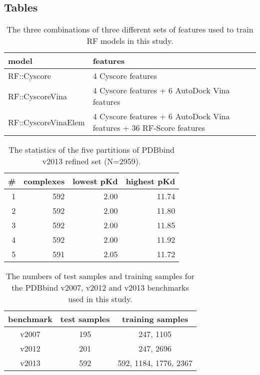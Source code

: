 \documentclass[twocolumn]{bmcart}
\begin{document}
\begin{backmatter}

\section*{Tables}

\begin{table}[ht]
\caption{The three combinations of three different sets of features used to train RF models in this study.}
\label{tbl:features}
\begin{tabular}{ll}
\hline
model & features\\
\hline
RF::Cyscore         & 4 Cyscore features\\
RF::CyscoreVina     & 4 Cyscore features + 6 AutoDock Vina features\\
RF::CyscoreVinaElem & 4 Cyscore features + 6 AutoDock Vina features + 36 RF-Score features\\
\hline
\end{tabular}
\end{table}

\begin{table}[ht]
\caption{The statistics of the five partitions of PDBbind v2013 refined set (N=2959).}
\label{tbl:partitions}
\begin{tabular}{rrrr}
\hline
\# & complexes & lowest pKd & highest pKd\\
\hline
1 & 592 & 2.00 & 11.74\\
2 & 592 & 2.00 & 11.80\\
3 & 592 & 2.00 & 11.85\\
4 & 592 & 2.00 & 11.92\\
5 & 591 & 2.05 & 11.72\\
\hline
\end{tabular}
\end{table}

\begin{table}[ht]
\caption{The numbers of test samples and training samples for the PDBbind v2007, v2012 and v2013 benchmarks used in this study.}
\label{tbl:benchmarks}
\begin{tabular}{ccc}
\hline
benchmark & test samples & training samples\\
\hline
v2007 & 195 & 247, 1105\\
v2012 & 201 & 247, 2696\\
v2013 & 592 & 592, 1184, 1776, 2367\\
\hline
\end{tabular}
\end{table}


\end{backmatter}
\end{document}
